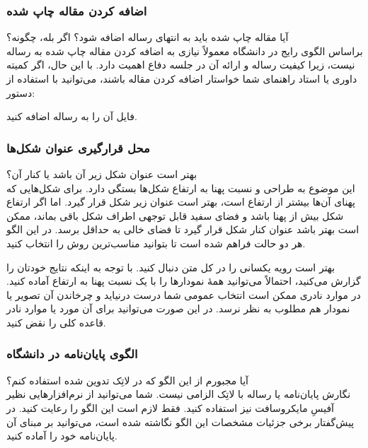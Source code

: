 \subsubsection{اضافه کردن مقاله چاپ شده}
آیا مقاله چاپ شده باید به انتهای رساله اضافه شود؟ اگر بله، چگونه؟\\
براساس الگوی رایج در دانشگاه معمولاً نیازی به اضافه کردن مقاله چاپ شده به رساله نیست، زیرا کیفیت رساله و ارائه آن در جلسه دفاع اهمیت دارد. با این حال، اگر کمیته داوری یا استاد راهنمای شما خواستار اضافه کردن مقاله باشند، می‌توانید با استفاده از دستور:
\begin{flushleft}
\end{flushleft}
فایل 
آن را به رساله اضافه کنید.
%


\subsubsection{محل قرارگیری عنوان شکل‌ها}
بهتر است عنوان شکل زیر آن باشد یا کنار آن؟\\
این موضوع به طراحی و نسبت پهنا به ارتفاع شکل‌ها بستگی دارد. برای شکل‌هایی که پهنای آن‌ها بیشتر از ارتفاع است، بهتر است عنوان زیر شکل قرار گیرد. اما اگر ارتفاع شکل بیش از پهنا باشد و فضای سفید قابل توجهی اطراف شکل باقی بماند، ممکن است بهتر باشد عنوان کنار شکل قرار گیرد تا فضای خالی به حداقل برسد. در این الگو هر دو حالت فراهم شده است تا بتوانید مناسب‌ترین روش را انتخاب کنید. 

بهتر است رویه یکسانی را در کل متن دنبال کنید. با توجه به اینکه نتایج خودتان را گزارش می‌کنید، احتمالاً می‌توانید همهٔ نمودارها را با یک نسبت پهنا به ارتفاع آماده کنید. در موارد نادری ممکن است انتخاب عمومی شما درست درنیاید و چرخاندن آن تصویر یا نمودار هم مطلوب به نظر نرسد. در این صورت می‌توانید برای آن مورد یا موارد نادر قاعده کلی را نقض کنید.


\subsubsection{الگوی پایان‌نامه در دانشگاه}
آیا مجبورم از این الگو که در لاتِک تدوین شده استفاده کنم؟\\
نگارش پایان‌نامه یا رساله با لاتِک الزامی نیست. شما می‌توانید از نرم‌افزارهایی نظیر آفیسِ مایکروسافت نیز استفاده کنید. فقط لازم است این الگو را رعایت کنید. در پیش‌گفتار برخی جزئیات مشخصات این الگو نگاشته شده است، می‌توانید بر مبنای آن پایان‌نامه خود را آماده کنید.

 